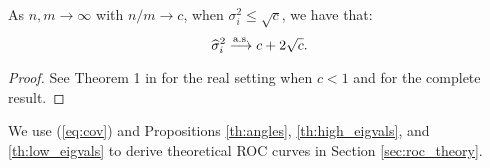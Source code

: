 \begin{prop}\label{th:low_eigvals}
As $n,m \longrightarrow \infty$ with $n/m \to c$, when $\sigma_i^2 \leq \sqrt{c}$, we have that:
\begin{equation*}
\widehat{\sigma}_i^2\overset{\textrm{a.s.}}{\longrightarrow} c + 2\sqrt{c}.
\end{equation*}
\end{prop}
\begin{proof}
See Theorem 1 in \cite{paul2007asymptotics} for the real setting when $c<1$ and \cite{benaych2011singular} for the complete result.
\end{proof}

We use (\ref{eq:cov}) and Propositions \ref{th:angles}, \ref{th:high_eigvals}, and \ref{th:low_eigvals} to derive theoretical ROC curves in Section \ref{sec:roc_theory}.
